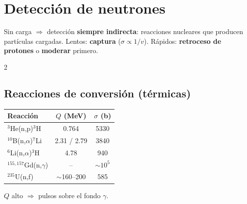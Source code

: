 \documentclass[10pt,a4paper]{article}
\newcommand{\imp}[1]{\textbf{\color{BrickRed}#1}}
\begin{document}
\section{Detección de neutrones}
\begin{clave}
Sin carga $\Rightarrow$ detección \imp{siempre indirecta}: reacciones nucleares que producen partículas cargadas. Lentos: \textbf{captura} ($\sigma\propto1/v$). Rápidos: \textbf{retroceso de protones} o \textbf{moderar} primero.
\end{clave}
\begin{multicols}{2}
\subsection{Reacciones de conversión (térmicas)}
\begin{tabular}{@{}lcc@{}}
\toprule
Reacción & $Q$ (MeV) & $\sigma$ (b)\\\midrule
$^3$He(n,p)$^3$H & 0.764 & 5330\\
$^{10}$B(n,$\alpha$)$^7$Li & 2.31 / 2.79 & 3840\\
$^6$Li(n,$\alpha$)$^3$H & 4.78 & 940\\
$^{155,157}$Gd(n,$\gamma$) & -- & $\sim10^5$\\
$^{235}$U(n,f) & $\sim$160--200 & 585\\\bottomrule
\end{tabular}

$Q$ alto $\Rightarrow$ pulsos sobre el fondo $\gamma$.

\end{multicols}
\end{document}
